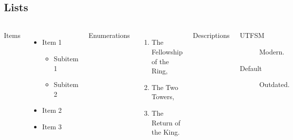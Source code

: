 \subsection{Lists}
\begin{frame}{\insertsectionhead}
  \framesubtitle{\insertsubsectionhead}
  \begin{columns}[T,onlytextwidth]
    Items
    \begin{itemize}
      \item Item 1
        \begin{itemize}
          \item Subitem 1
          \item Subitem 2
        \end{itemize}
      \item Item 2
      \item Item 3
    \end{itemize}

    Enumerations
    \begin{enumerate}
      \item The Fellowship of the Ring,
      \item The Two Towers,
      \item The Return of the King.
    \end{enumerate}

    Descriptions
    \begin{description}
      \item[UTFSM] Modern. \item[Default] Outdated.
    \end{description}
  \end{columns}
\end{frame}




